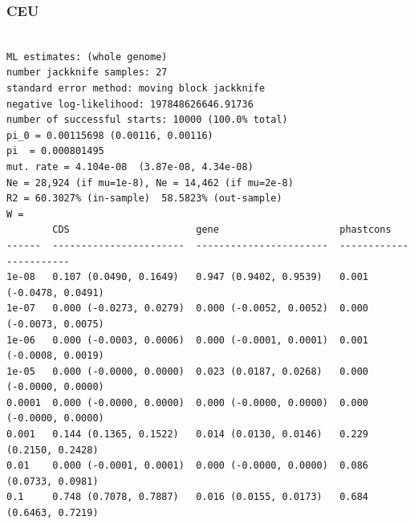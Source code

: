 \documentclass[11pt]{article}
\begin{document}
\subsubsection*{CEU}
\begin{minipage}{\linewidth}\begin{footnotesize}
\begin{verbatim}

ML estimates: (whole genome)
number jackknife samples: 27
standard error method: moving block jackknife
negative log-likelihood: 197848626646.91736
number of successful starts: 10000 (100.0% total)
pi_0 = 0.00115698 (0.00116, 0.00116)
pi  = 0.000801495
mut. rate = 4.104e-08  (3.87e-08, 4.34e-08)
Ne = 28,924 (if mu=1e-8), Ne = 14,462 (if mu=2e-8)
R2 = 60.3027% (in-sample)  58.5823% (out-sample)
W = 
        CDS                      gene                     phastcons
------  -----------------------  -----------------------  -----------------------
1e-08   0.107 (0.0490, 0.1649)   0.947 (0.9402, 0.9539)   0.001 (-0.0478, 0.0491)
1e-07   0.000 (-0.0273, 0.0279)  0.000 (-0.0052, 0.0052)  0.000 (-0.0073, 0.0075)
1e-06   0.000 (-0.0003, 0.0006)  0.000 (-0.0001, 0.0001)  0.001 (-0.0008, 0.0019)
1e-05   0.000 (-0.0000, 0.0000)  0.023 (0.0187, 0.0268)   0.000 (-0.0000, 0.0000)
0.0001  0.000 (-0.0000, 0.0000)  0.000 (-0.0000, 0.0000)  0.000 (-0.0000, 0.0000)
0.001   0.144 (0.1365, 0.1522)   0.014 (0.0130, 0.0146)   0.229 (0.2150, 0.2428)
0.01    0.000 (-0.0001, 0.0001)  0.000 (-0.0000, 0.0000)  0.086 (0.0733, 0.0981)
0.1     0.748 (0.7078, 0.7887)   0.016 (0.0155, 0.0173)   0.684 (0.6463, 0.7219)
\end{verbatim}
\end{footnotesize}\end{minipage}
\end{document}
